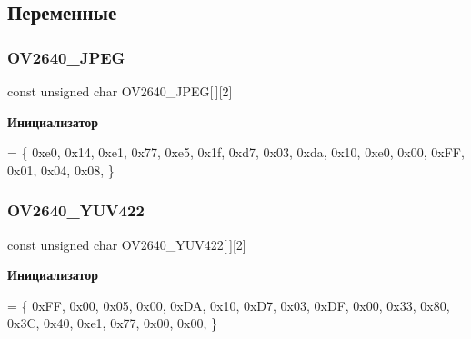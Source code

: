 \subsection{Переменные}
\mbox{\label{group___o_v2640___private___variables_gaa7b2e99897318151a22c0764d4d6e8f6}} 
\subsubsection{\texorpdfstring{O\+V2640\+\_\+\+J\+P\+EG}{OV2640\_JPEG}}
{\footnotesize\ttfamily const unsigned char O\+V2640\+\_\+\+J\+P\+EG\mbox{[}$\,$\mbox{]}\mbox{[}2\mbox{]}}

{\bfseries Инициализатор}
\begin{DoxyCode}
=
\{
  0xe0, 0x14,
  0xe1, 0x77,
  0xe5, 0x1f,
  0xd7, 0x03,
  0xda, 0x10,
  0xe0, 0x00,
  0xFF, 0x01,
  0x04, 0x08,
\}
\end{DoxyCode}
\mbox{\label{group___o_v2640___private___variables_gaa471e1a10205240a47ce7a6e45952536}} 
\subsubsection{\texorpdfstring{O\+V2640\+\_\+\+Y\+U\+V422}{OV2640\_YUV422}}
{\footnotesize\ttfamily const unsigned char O\+V2640\+\_\+\+Y\+U\+V422\mbox{[}$\,$\mbox{]}\mbox{[}2\mbox{]}}

{\bfseries Инициализатор}
\begin{DoxyCode}
= 
\{
  0xFF, 0x00,
  0x05, 0x00,
  0xDA, 0x10,
  0xD7, 0x03,
  0xDF, 0x00,
  0x33, 0x80,
  0x3C, 0x40,
  0xe1, 0x77,
  0x00, 0x00,
\}
\end{DoxyCode}
